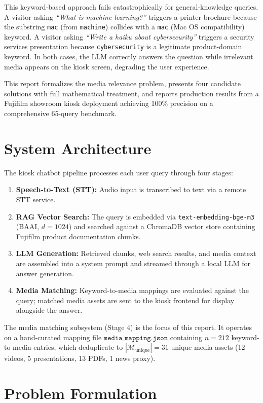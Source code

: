 \documentclass{article}
\begin{document}
This keyword-based approach fails catastrophically for general-knowledge queries. A visitor asking \textit{``What is machine learning?''} triggers a printer brochure because the substring \texttt{mac} (from \texttt{machine}) collides with a \texttt{mac} (Mac OS compatibility) keyword. A visitor asking \textit{``Write a haiku about cybersecurity''} triggers a security services presentation because \texttt{cybersecurity} is a legitimate product-domain keyword. In both cases, the LLM correctly answers the question while irrelevant media appears on the kiosk screen, degrading the user experience.

This report formalizes the media relevance problem, presents four candidate solutions with full mathematical treatment, and reports production results from a Fujifilm showroom kiosk deployment achieving 100\% precision on a comprehensive 65-query benchmark.

\section{System Architecture}

The kiosk chatbot pipeline processes each user query through four stages:
\begin{enumerate}
  \item \textbf{Speech-to-Text (STT):} Audio input is transcribed to text via a remote STT service.
  \item \textbf{RAG Vector Search:} The query is embedded via \texttt{text-embedding-bge-m3} (BAAI, $d = 1024$) and searched against a ChromaDB vector store containing Fujifilm product documentation chunks.
  \item \textbf{LLM Generation:} Retrieved chunks, web search results, and media context are assembled into a system prompt and streamed through a local LLM for answer generation.
  \item \textbf{Media Matching:} Keyword-to-media mappings are evaluated against the query; matched media assets are sent to the kiosk frontend for display alongside the answer.
\end{enumerate}

The media matching subsystem (Stage 4) is the focus of this report. It operates on a hand-curated mapping file $\texttt{media\_mapping.json}$ containing $n = 212$ keyword-to-media entries, which deduplicate to $|\mathcal{M}_{\text{unique}}| = 31$ unique media assets (12 videos, 5 presentations, 13 PDFs, 1 news proxy).

\section{Problem Formulation}
\end{document}
